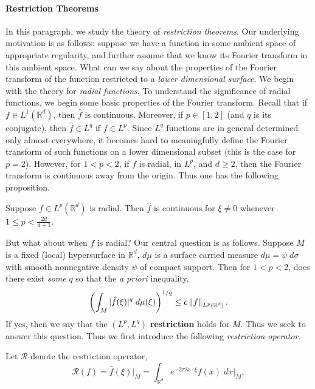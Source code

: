 \documentclass{article}
\begin{document}
\paragraph{Restriction Theorems} 
In this paragraph, we study the theory of \textit{restriction theorems}. Our underlying motivation is as follows: suppose we have a function in some ambient space of appropriate regularity, and further assume that we know its Fourier transform in this ambient space. What can we say about the properties of the Fourier transform of the function restricted to a \textit{lower dimensional surface}. We begin with the theory for \textit{radial functions}. To understand the significance of radial functions, we begin some basic properties of the Fourier transform. Recall that if $f \in L^{1}(\mathbb{R}^{d})$, then $\hat{f}$ is continuous. Moreover, if $p \in [1, 2]$ (and $q$ is its conjugate), then $\hat{f} \in L^{q}$ if $f \in L^{p}$. Since $L^{q}$ functions are in general determined only almost everywhere, it becomes hard to meaningfully define the Fourier transform of such functions on a lower dimensional subset (this is the case for $p= 2$). However, for $1 < p < 2$, if $f$ is radial, in $L^{p}$, and $d\geq 2$, then the Fourier transform is continuous away from the origin. Thus one has the following proposition. 
\begin{prop}
	Suppose $f \in L^{p}(\mathbb{R}^{d})$ is radial. Then $\hat{f}$ is continuous for $\xi \neq 0$ whenever $1 \leq p < \frac{2d}{d + 1}$. 
\end{prop} 
But what about when $f$ is radial? Our central question is as follows. Suppose $M$ is a fixed (local) hypersurface in $\mathbb{R}^{d}$, $d\mu$ is a surface carried measure $d\mu = \psi\;d\sigma$ with smooth nonnegative density $\psi$ of compact support. Then for $1 < p < 2$, does there exist \textit{some} $q$ so that the \textit{a priori} inequality, 
\begin{equation*}
	\left(\int_{M}|\hat{f}(\xi)|^{q}\;d\mu(\xi)\right)^{1/q} \leq c \left\Vert f \right\Vert_{L^{p}(\mathbb{R}^{d})}. 
\end{equation*}
If yes, then we say that the $(L^{p}, L^{q})$ \textbf{restriction} holds for $M$. Thus we seek to answer this question. Thus we first introduce the following \textit{restriction operator}.
\begin{definition}
	Let $\mathcal{R}$ denote the restriction operator, 
	\begin{equation*}
		\mathcal{R}(f) = \hat{f}(\xi)|_{M} = \int_{\mathbb{R}^{d}}e^{-2\pi i x \cdot \xi}f(x)\;dx\bigg|_{M}, 
	\end{equation*}
\end{definition} 
\end{document}
